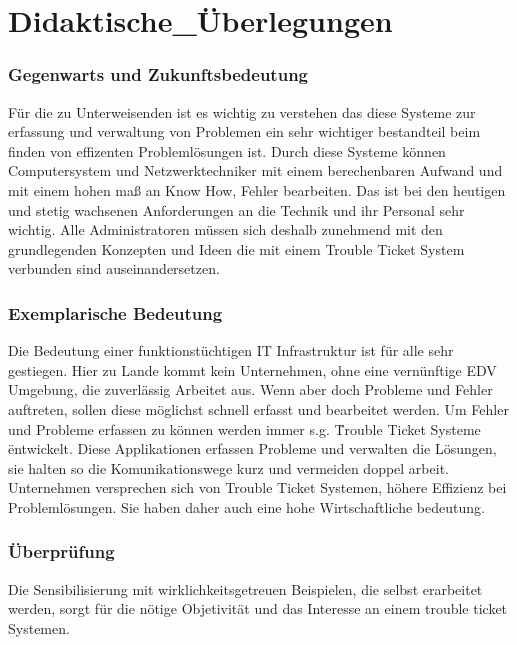 \chapter{Didaktische_Überlegungen}  %
\label{chapter:Didaktische_Überlegungen}  %

\subsection{Gegenwarts und Zukunftsbedeutung}
Für die zu Unterweisenden ist es wichtig zu verstehen das diese Systeme zur erfassung und verwaltung von Problemen ein sehr wichtiger bestandteil beim finden von effizenten Problemlösungen ist. Durch diese Systeme können Computersystem und Netzwerktechniker mit einem berechenbaren Aufwand und mit einem hohen maß an Know How, Fehler bearbeiten. Das ist bei den heutigen und stetig wachsenen Anforderungen an die Technik und ihr Personal sehr wichtig. Alle Administratoren müssen sich deshalb zunehmend mit den grundlegenden Konzepten und Ideen die mit einem Trouble Ticket System verbunden sind auseinandersetzen. 

\subsection{Exemplarische Bedeutung}
Die Bedeutung einer funktionstüchtigen IT Infrastruktur ist für alle sehr gestiegen. Hier zu Lande kommt kein Unternehmen, ohne eine vernünftige EDV Umgebung, die zuverlässig Arbeitet aus. Wenn aber doch Probleme und Fehler auftreten, sollen diese möglichst schnell erfasst und bearbeitet werden. 
Um Fehler und Probleme erfassen zu können werden immer s.g. \" Trouble Ticket Systeme \" entwickelt. Diese Applikationen erfassen Probleme und verwalten die Lösungen, sie halten so die Komunikationswege kurz und vermeiden doppel arbeit. 
Unternehmen versprechen sich von Trouble Ticket Systemen, höhere Effizienz bei Problemlösungen. Sie haben daher auch eine hohe Wirtschaftliche bedeutung.


\subsection{Überprüfung}
Die Sensibilisierung mit wirklichkeitsgetreuen Beispielen, die selbst erarbeitet werden, sorgt für die nötige Objetivität und das Interesse an einem trouble ticket Systemen. 

